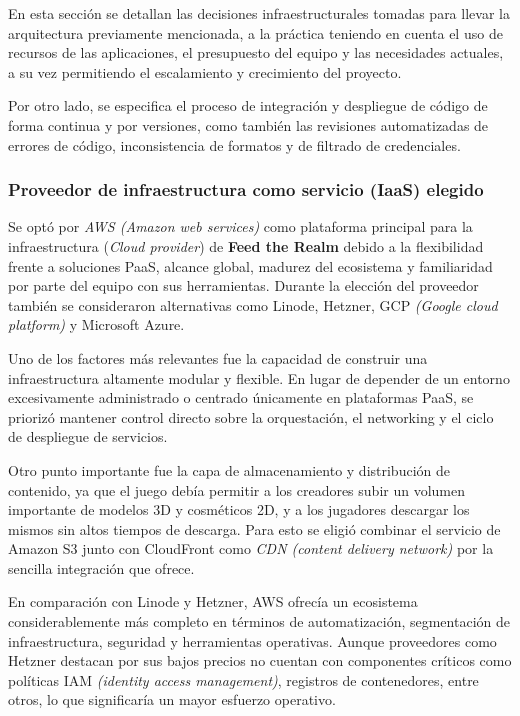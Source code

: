 En esta sección se detallan las decisiones infraestructurales tomadas para llevar la arquitectura previamente mencionada, a la práctica teniendo en cuenta el uso de recursos de las aplicaciones,
el presupuesto del equipo y las necesidades actuales, a su vez permitiendo el escalamiento y crecimiento del proyecto.

Por otro lado, se especifica el proceso de integración y despliegue de código de forma continua y por versiones,
como también las revisiones automatizadas de errores de código, inconsistencia de formatos y de filtrado de credenciales.

\subsubsection{Proveedor de infraestructura como servicio (IaaS) elegido}

Se optó por \textit{AWS (Amazon web services)} como plataforma principal para la infraestructura (\textit{Cloud provider}) de \textbf{Feed the Realm}
debido a la flexibilidad frente a soluciones PaaS, alcance global, madurez del ecosistema y familiaridad por parte del equipo con sus herramientas.
Durante la elección del proveedor también se consideraron alternativas como Linode, Hetzner, 
GCP \textit{(Google cloud platform)} y Microsoft Azure.

Uno de los factores más relevantes fue la capacidad de construir una infraestructura altamente modular y flexible.
En lugar de depender de un entorno excesivamente administrado o centrado únicamente en plataformas PaaS,
se priorizó mantener control directo sobre la orquestación, el networking y el ciclo de despliegue de servicios.

Otro punto importante fue la capa de almacenamiento y distribución de contenido, ya que el juego debía permitir
a los creadores subir un volumen importante de modelos 3D y cosméticos 2D, y a los jugadores descargar los mismos sin
altos tiempos de descarga. Para esto se eligió combinar el servicio de Amazon S3 junto con CloudFront como 
\textit{CDN (content delivery network)} por la sencilla integración que ofrece.

En comparación con Linode y Hetzner, AWS ofrecía un ecosistema considerablemente más completo en términos de automatización,
segmentación de infraestructura, seguridad y herramientas operativas. Aunque proveedores como Hetzner destacan por sus bajos precios
no cuentan con componentes críticos como políticas IAM \textit{(identity access management)}, registros de contenedores, entre otros,
lo que significaría un mayor esfuerzo operativo.

